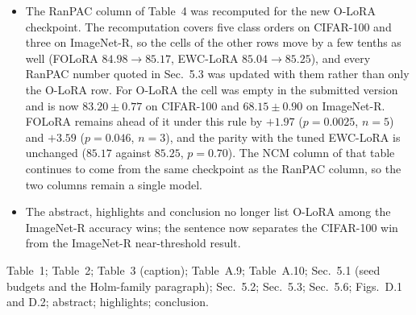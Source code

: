 \begin{itemize}
  CIFAR-100 the lowest curve is no longer O-LoRA but Seq-LoRA, so the vertical axis of that
  figure is now bounded at $65$ instead of $60$, and the caption and the sentence in
  Sec.~5.2 that quote the plotted spread were updated to the recomputed
  values ($95.1$--$98.2$ at the smallest candidate set and $69.3$--$78.0$ at the full one,
  against the previous $93.6$--$98.2$ and $64.9$--$78.0$); on ImageNet-R the same
  substitution moves the lowest plotted value from $53.72$ to $56.58$, so the caption's
  margin above the axis floor changes from $3.72$ to $6.58$ points. The captions also now
  state the seed budget each curve is drawn on ($5$ for O-LoRA on CIFAR-100, $3$ on
  ImageNet-R) and the isotropic row among those tabulated but not drawn.
\item The RanPAC column of Table~4 was recomputed for the new O-LoRA checkpoint. The
  recomputation covers five class orders on CIFAR-100 and three on ImageNet-R, so the
  cells of the other rows move by a few tenths as well (FOLoRA $84.98\to85.17$, EWC-LoRA
  $85.04\to85.25$), and every RanPAC number quoted in Sec.~5.3 was updated with them
  rather than only the O-LoRA row. For O-LoRA the cell was empty in the submitted version
  and is now $83.20\pm0.77$ on CIFAR-100 and $68.15\pm0.90$ on ImageNet-R. FOLoRA remains
  ahead of it under this rule by $+1.97$ ($p=0.0025$, $n=5$) and $+3.59$ ($p=0.046$,
  $n=3$), and the parity with the tuned EWC-LoRA is unchanged ($85.17$ against $85.25$,
  $p=0.70$). The NCM column of that table continues to come from the same checkpoint as
  the RanPAC column, so the two columns remain a single model.
\item The abstract, highlights and conclusion no longer list O-LoRA among the ImageNet-R
  accuracy wins; the sentence now separates the CIFAR-100 win from the ImageNet-R
  near-threshold result.
\end{itemize}

\change Table~1; Table~2; Table~3 (caption); Table~A.9; Table~A.10;
Sec.~5.1 (seed budgets and the Holm-family paragraph); Sec.~5.2; Sec.~5.3; Sec.~5.6;
Figs.~D.1 and D.2; abstract; highlights; conclusion.
